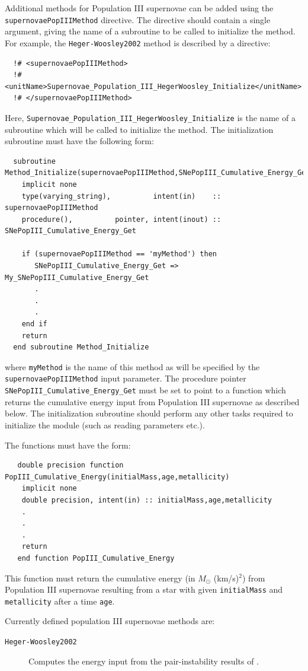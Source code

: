 Additional methods for Population III supernovae can be added using the {\tt supernovaePopIIIMethod} directive. The directive should contain a single argument, giving the name of a subroutine to be called to initialize the method. For example, the {\tt Heger-Woosley2002} method is described by a directive:
\begin{verbatim}
  !# <supernovaePopIIIMethod>
  !#  <unitName>Supernovae_Population_III_HegerWoosley_Initialize</unitName>
  !# </supernovaePopIIIMethod>
\end{verbatim}
Here, {\tt Supernovae\_Population\_III\_HegerWoosley\_Initialize} is the name of a subroutine which will be called to initialize the method. The initialization subroutine must have the following form:
\begin{verbatim}
  subroutine Method_Initialize(supernovaePopIIIMethod,SNePopIII_Cumulative_Energy_Get)
    implicit none
    type(varying_string),          intent(in)    :: supernovaePopIIIMethod
    procedure(),          pointer, intent(inout) :: SNePopIII_Cumulative_Energy_Get
    
    if (supernovaePopIIIMethod == 'myMethod') then
       SNePopIII_Cumulative_Energy_Get => My_SNePopIII_Cumulative_Energy_Get
       .
       .
       .
    end if
    return
  end subroutine Method_Initialize
\end{verbatim}
where {\tt myMethod} is the name of this method as will be specified by the {\tt supernovaePopIIIMethod} input parameter. The procedure pointer {\tt SNePopIII\_Cumulative\_Energy\_Get} must be set to point to a function which returns the cumulative energy input from Population III supernovae as described below. The initialization subroutine should perform any other tasks required to initialize the module (such as reading parameters etc.).

The functions must have the form:
\begin{verbatim}
   double precision function PopIII_Cumulative_Energy(initialMass,age,metallicity)
    implicit none
    double precision, intent(in) :: initialMass,age,metallicity
    .
    .
    .
    return
   end function PopIII_Cumulative_Energy 
\end{verbatim}
This function must return the cumulative energy (in $M_\odot$ (km/s)$^2$) from Population III supernovae resulting from a star with given {\tt initialMass} and {\tt metallicity} after a time {\tt age}.

Currently defined population III supernovae methods are:
\begin{description}
 \item [{\tt Heger-Woosley2002}] Computes the energy input from the pair-instability results of \cite{heger_nucleosynthetic_2002}.
\end{description}

